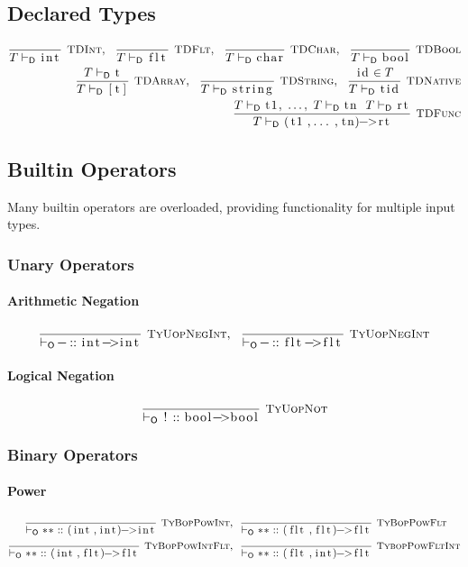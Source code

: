 \documentclass{article}
\newcommand{\code}[1]{\lstinline[columns=fixed]{#1}}
\newcommand{\drmrule}[5]{\frac{#1}{#2\vdash_{\mathsf{#3}}#4}\textsc{\ \small{#5}}}
\newcommand{\ruleapp}[1]{\vdash_{\mathsf{#1}}}
\newcommand{\mc}[1]{\textnormal{\code{#1}}}
\newcommand{\subsubsubsection}{\paragraph}
\begin{document}
		\subsection{Declared Types}
			
				\begin{align*}
					\drmrule{}{T}{D}{\mc{int}}{TDInt},\ \ \drmrule{}{T}{D}{\mc{flt}}{TDFlt},\ \ 
					\drmrule{}{T}{D}{\mc{char}}{TDChar},\ \ \drmrule{}{T}{D}{\mc{bool}}{TDBool}\\
					\drmrule{T\ruleapp{D}\mc{t}}{T}{D}{\mc{[t]}}{TDArray},\ \ \drmrule{}{T}{D}{\mc{string}}{TDString},\ \ 
					\drmrule{\mc{id}\in T}{T}{D}{\mc{tid}}{TDNative}\\
					\drmrule{T\ruleapp{D}\mc{t1},\ \dots,\ T\ruleapp{D}\mc{tn}\ \ T\ruleapp{D}\mc{rt}}{T}{D}{\mc{(t1,...,tn)->rt}}{TDFunc}
				\end{align*}
		
		\subsection{Builtin Operators}
		
			Many builtin operators are overloaded, providing functionality for multiple input types.
			
			\subsubsection{Unary Operators}
			
				\subsubsubsection{Arithmetic Negation}
				
					\begin{align*}
						\drmrule{}{}{O}{\mc{-} :: \mc{int->int}}{TyUopNegInt},\ \ 
						\drmrule{}{}{O}{\mc{-} :: \mc{flt->flt}}{TyUopNegInt}
					\end{align*}
				
				\subsubsubsection{Logical Negation}

					\begin{align*}
						\drmrule{}{}{O}{\mc{!} :: \mc{bool->bool}}{TyUopNot}
					\end{align*}
			
			\subsubsection{Binary Operators}
			
				\subsubsubsection{Power}
				
					\begin{align*}
						\drmrule{}{}{O}{\mc{**} :: \mc{(int,int)->int}}{TyBopPowInt},\ \ &
						\drmrule{}{}{O}{\mc{**} :: \mc{(flt,flt)->flt}}{TyBopPowFlt}\\
						\drmrule{}{}{O}{\mc{**} :: \mc{(int,flt)->flt}}{TyBopPowIntFlt},\ \ &
						\drmrule{}{}{O}{\mc{**} :: \mc{(flt,int)->flt}}{TybopPowFltInt}
					\end{align*}
				
\end{document}
